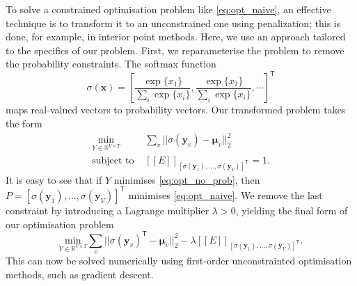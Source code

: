 \documentclass[acmsmall, review, anonymous]{acmart}\settopmatter{printfolios=true,printccs=false,printacmref=false}
\newcommand{\qqpi}[2]{[\![#2]\!]_{#1}}
\begin{document}
To solve a constrained optimisation problem like \autoref{eq:opt_naive}, an effective technique is to transform it to an unconstrained one using penalization; this is done, for example, in interior point methods.
Here, we use an approach tailored to the specifics of our problem.
First, we reparameterise the problem to remove the probability constraints.
The softmax function
\begin{equation}\label{eq:softmax}
	\sigma(\bm{x}) = \left[\frac{\exp\{x_1\}}{\sum_i \exp\{x_i\}}, \frac{\exp\{x_2\}}{\sum_i \exp\{x_i\}}, \cdots \right]^\mathsf{T}
\end{equation}
maps real-valued vectors to probability vectors.
Our transformed problem takes the form
\begin{equation}
	\begin{aligned}\label{eq:opt_no_prob}
		\underset{Y \in \mathbb{R}^{V \times T}}{\mathrm{min}} &
		\sum_v || \sigma(\bm{y}_v) - \bm{\mu}_v ||_2^2                                                                         \\
		\text{subject to }                                     & \qqpi{[\sigma(\bm{y}_1), \ldots, \sigma(\bm{y}_{V})]^\mathsf{T}}{E} = 1.
	\end{aligned}
\end{equation}
It is easy to see that if $Y$ minimises \eqref{eq:opt_no_prob}, then
$P = [\sigma(\bm{y}_1), \ldots, \allowbreak \sigma(\bm{y}_{V})]^\mathsf{T}$
minimises \eqref{eq:opt_naive}.
% 
We remove the last constraint by introducing a Lagrange multiplier $\lambda > 0$, yielding the final form of our optimisation problem
\begin{equation}\label{eq:objective}
	\underset{Y \in \mathbb{R}^{V \times T}}{\mathrm{min}}
	\sum_v || \sigma(\bm{y}_v)^\mathsf{T} - \bm{\mu}_v ||_2^2
	- \lambda \qqpi{[\sigma(\bm{y}_1), \ldots, \sigma(\bm{y}_{V})]^\mathsf{T}}{E}.
\end{equation}
This can now be solved numerically using first-order unconstrainted optimisation methods, such as gradient descent.
\end{document}
